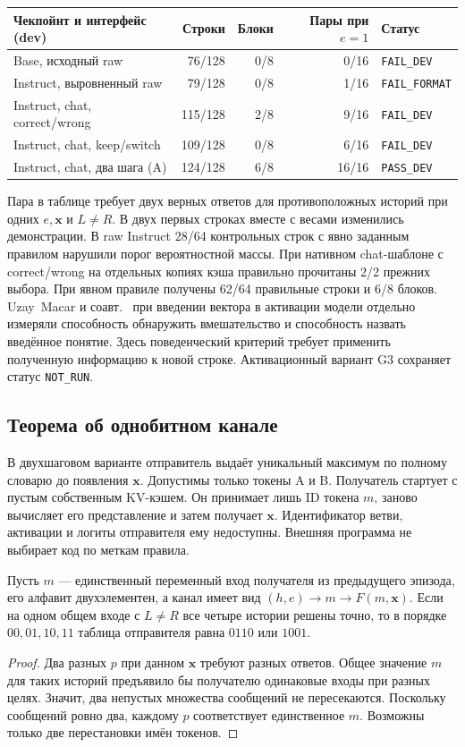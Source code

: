 \begin{center}\small
\begin{tabularx}{\linewidth}{@{}Xrrrl@{}}\toprule
Чекпойнт и интерфейс (dev) & Строки & Блоки & Пары при $e=1$ & Статус \\\midrule
Base, исходный raw & 76/128 & 0/8 & 0/16 & \texttt{FAIL\_DEV}\\
Instruct, выровненный raw & 79/128 & 0/8 & 1/16 & \texttt{FAIL\_FORMAT}\\
Instruct, chat, correct/wrong & 115/128 & 2/8 & 9/16 & \texttt{FAIL\_DEV}\\
Instruct, chat, keep/switch & 109/128 & 0/8 & 6/16 & \texttt{FAIL\_DEV}\\
Instruct, chat, два шага (A) & 124/128 & 6/8 & 16/16 & \texttt{PASS\_DEV}\\
\bottomrule\end{tabularx}
\end{center}
Пара в таблице требует двух верных ответов для противоположных историй при одних $e,\mathbf{x}$ и $L\ne R$. В двух первых строках вместе с весами изменились демонстрации. В raw Instruct 28/64 контрольных строк с явно заданным правилом нарушили порог вероятностной массы. При нативном chat-шаблоне с correct/wrong на отдельных копиях кэша правильно прочитаны 2/2 прежних выбора. При явном правиле получены 62/64 правильные строки и 6/8 блоков. \foreignlanguage{english}{Uzay~Macar} и соавт.~\cite{macar2026} при введении вектора в активации модели отдельно измеряли способность обнаружить вмешательство и способность назвать введённое понятие. Здесь поведенческий критерий требует применить полученную информацию к новой строке. Активационный вариант G3 сохраняет статус \texttt{NOT\_RUN}.

\subsection{Теорема об однобитном канале}
В двухшаговом варианте отправитель выдаёт уникальный максимум по полному словарю до появления $\mathbf{x}$. Допустимы только токены A и B. Получатель стартует с пустым собственным KV-кэшем. Он принимает лишь ID токена $m$, заново вычисляет его представление и затем получает $\mathbf{x}$. Идентификатор ветви, активации и логиты отправителя ему недоступны. Внешняя программа не выбирает код по меткам правила.

\begin{proposition}
Пусть $m$ --- единственный переменный вход получателя из предыдущего эпизода, его алфавит двухэлементен, а канал имеет вид $(h,e)\longrightarrow m\longrightarrow F(m,\mathbf{x})$. Если на одном общем входе с $L\ne R$ все четыре истории решены точно, то в порядке $00,01,10,11$ таблица отправителя равна $0110$ или $1001$.
\end{proposition}
\begin{proof}
Два разных $p$ при данном $\mathbf{x}$ требуют разных ответов. Общее значение $m$ для таких историй предъявило бы получателю одинаковые входы при разных целях. Значит, два непустых множества сообщений не пересекаются. Поскольку сообщений ровно два, каждому $p$ соответствует единственное $m$. Возможны только две перестановки имён токенов.
\end{proof}

